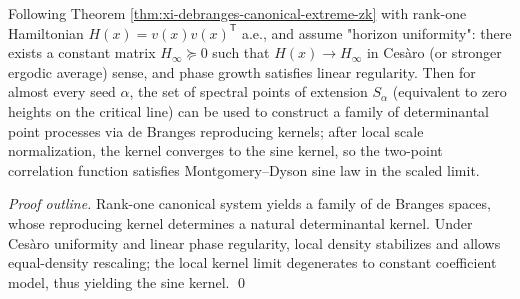 \begin{proposition}\label{prop:xi-debranges-dpp-sine-kernel-limit}
Following Theorem \ref{thm:xi-debranges-canonical-extreme-zk} with rank-one Hamiltonian \(H(x)=v(x)v(x)^{\mathsf T}\) a.e.,
and assume "horizon uniformity": there exists a constant matrix \(H_\infty\succeq 0\) such that \(H(x)\to H_\infty\) in Cesàro (or stronger ergodic average) sense, and phase growth satisfies linear regularity.
Then for almost every seed \(\alpha\), the set of spectral points of extension \(S_\alpha\) (equivalent to zero heights on the critical line) can be used to construct a family of determinantal point processes via de Branges reproducing kernels; after local scale normalization, the kernel converges to the sine kernel, so the two-point correlation function satisfies Montgomery--Dyson sine law in the scaled limit.
\end{proposition}
\begin{proof}[Proof outline]
Rank-one canonical system yields a family of de Branges spaces, whose reproducing kernel determines a natural determinantal kernel.
Under Cesàro uniformity and linear phase regularity, local density stabilizes and allows equal-density rescaling; the local kernel limit degenerates to constant coefficient model, thus yielding the sine kernel. \qed
\end{proof}

